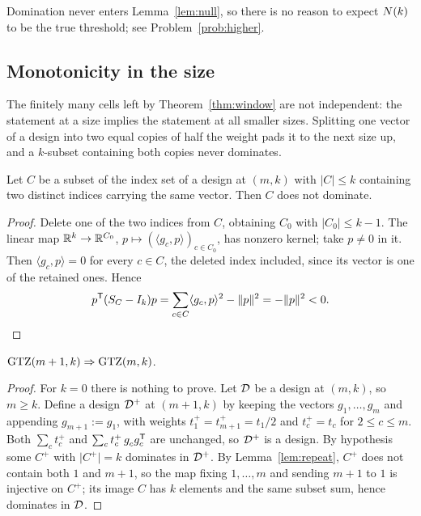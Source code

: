 Domination never enters Lemma~\ref{lem:null}, so there is no reason to
expect $N(k)$ to be the true threshold; see Problem~\ref{prob:higher}.

\subsection{Monotonicity in the size}\label{sec:monotone}

The finitely many cells left by Theorem~\ref{thm:window} are not
independent: the statement at a size implies the statement at all smaller
sizes.  Splitting one vector of a design into two equal copies of half the
weight pads it to the next size up, and a $k$-subset containing both
copies never dominates.

\begin{lemma}[Lean]\label{lem:repeat}
Let $C$ be a subset of the index set of a design at $(m,k)$ with
$\lvert C\rvert\le k$ containing two distinct indices carrying the same
vector.  Then $C$ does not dominate.
\end{lemma}

\begin{proof}
Delete one of the two indices from $C$, obtaining $C_0$ with $\lvert
C_0\rvert\le k-1$.  The linear map $\mathbb{R}^k\to\mathbb{R}^{C_0}$, $p\mapsto(\langle
g_c,p\rangle)_{c\in C_0}$, has nonzero kernel; take $p\ne0$ in it.  Then
$\langle g_c,p\rangle=0$ for every $c\in C$, the deleted index included,
since its vector is one of the retained ones.  Hence
\[
  p^{\mathsf{T}}(S_{C}-I_k)p=\sum_{c\in C}\langle g_c,p\rangle^2-\lVert p\rVert^2
  =-\lVert p\rVert^2<0 . \qedhere
\]
\end{proof}

\begin{proposition}[Lean]\label{prop:splitting}
$\mathrm{GTZ}(m+1,k)\Rightarrow\mathrm{GTZ}(m,k)$.
\end{proposition}

\begin{proof}
For $k=0$ there is nothing to prove.  Let $\mathcal{D}$ be a design at $(m,k)$, so
$m\ge k$.  Define a design $\mathcal{D}^{+}$ at $(m+1,k)$ by keeping the vectors
$g_1,\dots,g_m$ and appending $g_{m+1}:=g_1$, with weights
$t^{+}_1=t^{+}_{m+1}=t_1/2$ and $t^{+}_c=t_c$ for $2\le c\le m$.  Both
$\sum_ct^{+}_c$ and $\sum_ct^{+}_c\,g_c^{\vphantom{\mathsf{T}}}g_c\tp$ are
unchanged, so $\mathcal{D}^{+}$ is a design.  By hypothesis some $C^{+}$ with
$\lvert C^{+}\rvert=k$ dominates in $\mathcal{D}^{+}$.  By Lemma~\ref{lem:repeat},
$C^{+}$ does not contain both
$1$ and $m+1$, so the map fixing $1,\dots,m$ and sending $m+1$ to $1$ is
injective on $C^{+}$; its image $C$ has $k$ elements and the same subset sum,
hence dominates in $\mathcal{D}$.
\end{proof}

